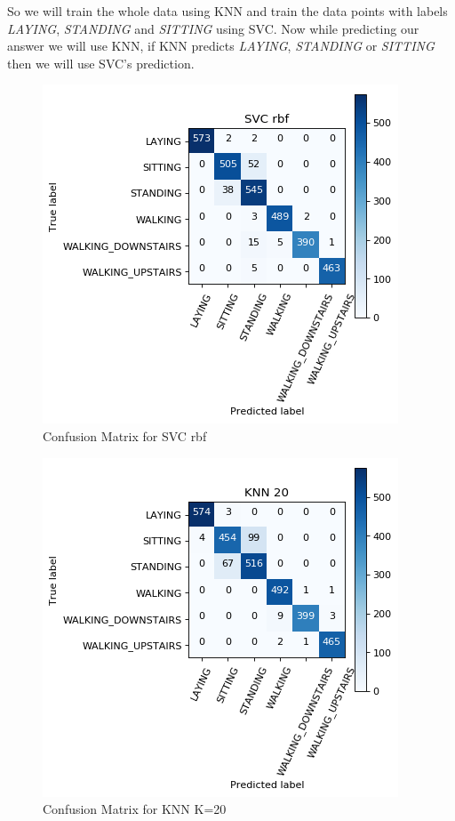 \documentclass[12pt]{article}
\begin{document}
So we will train the whole data using KNN and train the data points with labels \textit{LAYING}, \textit{STANDING} and \textit{SITTING} using SVC. Now while predicting our answer we will use KNN, if KNN predicts \textit{LAYING}, \textit{STANDING} or \textit{SITTING} then we will use SVC's prediction.
\begin{figure}[H]
	\centering
	\includegraphics[scale=0.450]{svc.png}
	\caption{Confusion Matrix for SVC rbf}
	\label{fig:svc}
\end{figure}
\begin{figure}[H]
	\centering
	\includegraphics[scale=0.450]{knn.png}
	\caption{Confusion Matrix for KNN K=20}
	\label{fig:knn}
\end{figure}
\end{document}
